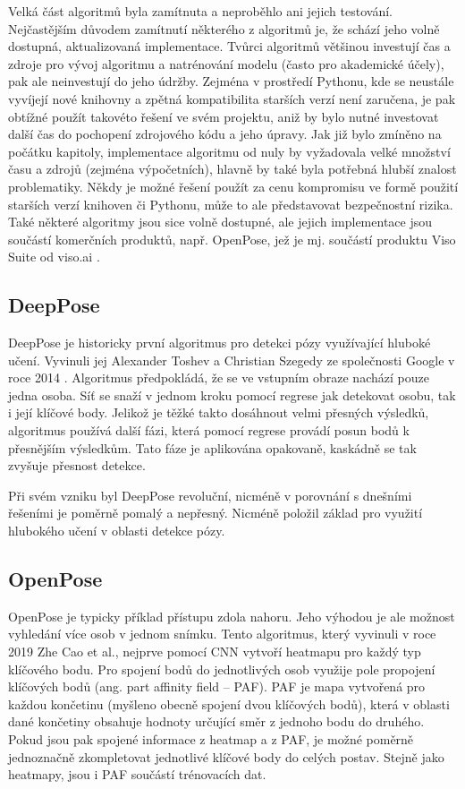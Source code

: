 Velká část algoritmů byla zamítnuta a neproběhlo ani jejich testování.
Nejčastějším důvodem zamítnutí některého z algoritmů je, že schází jeho volně
dostupná, aktualizovaná implementace. Tvůrci algoritmů většinou investují čas a
zdroje pro vývoj algoritmu a natrénování modelu (často pro akademické účely),
pak ale neinvestují do jeho údržby. Zejména v prostředí Pythonu, kde se
neustále vyvíjejí nové knihovny a zpětná kompatibilita starších verzí není
zaručena, je pak obtížné použít takovéto řešení ve svém projektu, aniž by bylo
nutné investovat další čas do pochopení zdrojového kódu a jeho úpravy. Jak již
bylo zmíněno na počátku kapitoly, implementace algoritmu od nuly by vyžadovala
velké množství času a zdrojů (zejména výpočetních), hlavně by také byla
potřebná hlubší znalost problematiky. Někdy je možné řešení použít za cenu
kompromisu ve formě použití starších verzí knihoven či Pythonu, může to ale
představovat bezpečnostní rizika. Také některé algoritmy jsou sice volně
dostupné, ale jejich implementace jsou součástí komerčních produktů, např.
OpenPose, jež je mj. součástí produktu Viso Suite od viso.ai
\cite{visoai_openpose}.

\subsection{DeepPose}

DeepPose je historicky první algoritmus pro detekci pózy využívající hluboké
učení. Vyvinuli jej Alexander Toshev a Christian Szegedy ze společnosti Google
v roce 2014 \cite{deeppose}. Algoritmus předpokládá, že se ve vstupním obraze
nachází pouze jedna osoba. Síť se snaží v jednom kroku pomocí regrese jak
detekovat osobu, tak i její klíčové body. Jelikož je těžké takto dosáhnout
velmi přesných výsledků, algoritmus používá další fázi, která pomocí regrese
provádí posun bodů k přesnějším výsledkům. Tato fáze je aplikována opakovaně,
kaskádně se tak zvyšuje přesnost detekce.

Při svém vzniku byl DeepPose revoluční, nicméně v porovnání s dnešními řešeními
je poměrně pomalý a nepřesný. Nicméně položil základ pro využití hlubokého
učení v oblasti detekce pózy.

\subsection{OpenPose}

OpenPose \cite{openpose} je typicky příklad přístupu zdola nahoru. Jeho výhodou
je ale možnost vyhledání více osob v jednom snímku. Tento algoritmus, který
vyvinuli v roce 2019 Zhe Cao et al., nejprve pomocí CNN vytvoří heatmapu pro
každý typ klíčového bodu. Pro spojení bodů do jednotlivých osob využije pole
propojení klíčových bodů (ang. part affinity field – PAF). PAF je mapa
vytvořená pro každou končetinu (myšleno obecně spojení dvou klíčových bodů),
která v oblasti dané končetiny obsahuje hodnoty určující směr z jednoho bodu do
druhého. Pokud jsou pak spojené informace z heatmap a z PAF, je možné poměrně
jednoznačně zkompletovat jednotlivé klíčové body do celých postav. Stejně jako
heatmapy, jsou i PAF součástí trénovacích dat.

